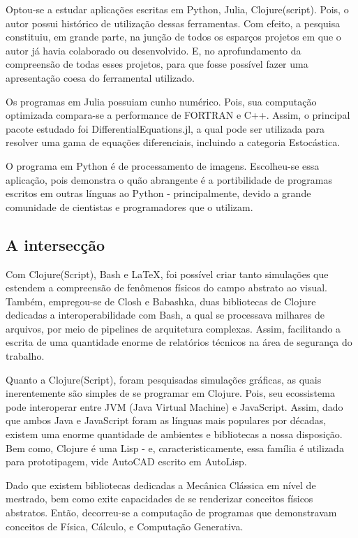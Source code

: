 \documentclass[
12pt,				%
openright,			%
oneside,			%
a4paper,			%
brazil,				%
english,			%
]{abntex2}
\begin{document}
Optou-se a estudar aplicações escritas em Python, Julia,
Clojure(script). Pois, o autor possui histórico de
utilização dessas ferramentas. Com efeito, a pesquisa constituiu, em
grande parte, na junção de todos os esparços projetos em que o autor
já havia colaborado ou desenvolvido. E, no aprofundamento da
compreensão de todas esses projetos, para que fosse possível fazer uma
apresentação coesa do ferramental utilizado.

Os programas em Julia possuiam cunho numérico. Pois, sua computação
optimizada compara-se a performance de FORTRAN e C++. Assim, o
principal pacote estudado foi DifferentialEquations.jl, a qual pode
ser utilizada para resolver uma gama de equações diferenciais,
incluindo a categoria Estocástica.

O programa em Python é de processamento de imagens. Escolheu-se essa
aplicação, pois demonstra o quão abrangente é a portibilidade de
programas escritos em outras línguas ao Python - principalmente,
devido a grande comunidade de cientistas e programadores que o
utilizam.

\subsection{A intersecção}

Com Clojure(Script), Bash e \LaTeX{}, foi possível criar tanto
simulações que estendem a compreensão de fenômenos físicos do campo
abstrato ao visual. Também, empregou-se de Closh e Babashka, duas
bibliotecas de Clojure dedicadas a interoperabilidade com Bash, a qual
se processava milhares de arquivos, por meio de pipelines de
arquitetura complexas. Assim, facilitando a escrita de uma quantidade
enorme de relatórios técnicos na área de segurança do trabalho. 

Quanto a Clojure(Script), foram pesquisadas simulações gráficas, as
quais inerentemente são simples de se programar em Clojure. Pois, seu
ecossistema pode interoperar entre JVM (Java Virtual Machine) e
JavaScript. Assim, dado que ambos Java e JavaScript foram as línguas
mais populares por décadas, existem uma enorme quantidade de ambientes
e bibliotecas a nossa disposição. Bem como, Clojure é uma Lisp - e,
caracteristicamente, essa família é utilizada para prototipagem, vide
AutoCAD escrito em AutoLisp.

Dado que existem bibliotecas dedicadas a Mecânica Clássica em nível de
mestrado, bem como exite capacidades de se renderizar conceitos
físicos abstratos. Então, decorreu-se a computação de programas que
demonstravam conceitos de Física, Cálculo, e Computação Generativa.
\end{document}
